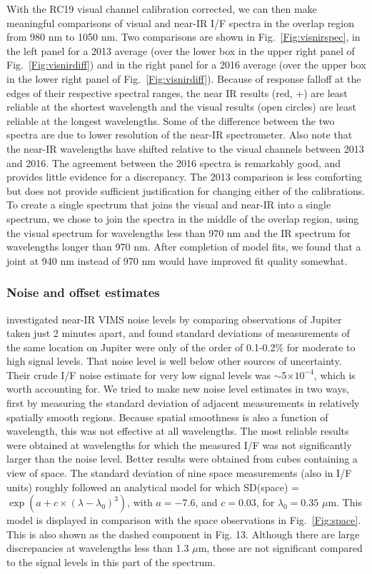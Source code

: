 \documentclass[article,11pt]{emulateapj}
\def\mumx{$\mu$m}
\begin{document}
With the RC19 visual channel calibration corrected, we can then
 make meaningful comparisons of visual and near-IR I/F spectra in
the overlap region from 980 nm to 1050 nm.
Two comparisons are shown in Fig.\ \ref{Fig:visnirspec}, in the left
panel for a 2013 average (over the lower box in the upper right panel
of Fig.\ \ref{Fig:visnirdiff}) and in the right panel for a 2016
average (over the upper box in the lower right panel of
Fig.\ \ref{Fig:visnirdiff}).  Because of response falloff at the edges
of their respective spectral ranges, the near IR results (red, +) are least
reliable at the shortest wavelength and the visual results (open
circles) are least reliable at the longest wavelengths. Some of the
difference between the two spectra are due to lower resolution of the
near-IR spectrometer. Also note that the near-IR wavelengths have
shifted relative to the visual channels between 2013 and 2016.  The
agreement between the 2016 spectra is remarkably good, and provides
little evidence for a discrepancy.  The 2013 comparison is less
comforting but does not provide sufficient justification for changing
either of the calibrations.  To create a single spectrum that joins
the visual and near-IR into a single spectrum, we chose to join the
spectra in the middle of the overlap region, using the visual spectrum
for wavelengths less than 970 nm and the IR spectrum for wavelengths
longer than 970 nm.  After completion of model fits, we found that
a joint at 940 nm instead of 970 nm would have improved fit quality somewhat.

\subsubsection{Noise and offset estimates}

\cite{Sro2010vims} investigated near-IR VIMS noise levels by comparing
observations of Jupiter taken just 2 minutes apart, and found standard
deviations of measurements of the same location on Jupiter were only
of the order of 0.1-0.2\% for moderate to high signal levels.  That
noise level is well below other sources of uncertainty.  Their crude
I/F noise estimate for very low signal levels was $\sim$5$\times
10^{-4}$, which is worth accounting for.  We tried to make new noise
level estimates in two ways, first by measuring the standard deviation of adjacent
measurements in relatively spatially smooth regions. Because spatial
smoothness is also a function of wavelength, this was not effective at
all wavelengths.  The most reliable results were obtained at
wavelengths for which the measured I/F was not significantly larger
than the noise level.  Better results were obtained from cubes
containing a view of space.  The standard deviation of nine space
measurements (also in I/F units) roughly followed an analytical model for which SD(space) = $\exp(a
+ c\times(\lambda -\lambda_0)^3)$, with $a=-7.6$, and $c = 0.03$, for
$\lambda_0 = 0.35$ \mumx.  This model is displayed in comparison with
the space observations in Fig.\ \ref{Fig:space}.  This is also shown
as the dashed component in Fig. 13.  Although there are
large discrepancies at wavelengths less than 1.3 \mumx, these are not
significant compared to the signal levels in this part of the
spectrum.
\end{document}
